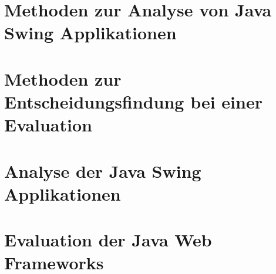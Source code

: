 \documentclass[
11pt, %
a4paper, %
BCOR25mm, %
DIV14, %
footsepline = false, %
headsepline, %
twoside, %
openright,
abstracton, %
listof=totocnumbered, %
bibliography=totocnumbered %
]{scrreprt}
\begin{document}
  

  \cleardoublepage
   
   
  \chapter{Methoden zur Analyse von Java Swing
  Applikationen}\label{chapter:MethodenZurAnalyseVonJavaSwingApplikationen}
  
  

  \cleardoublepage
  
   
  \chapter{Methoden zur Entscheidungsfindung bei einer
  Evaluation}\label{chapter:MethodenZurEntscheidungsfindungBeiEinerEvaluation}
  
  

  \cleardoublepage
   
   
  \chapter{Analyse der Java Swing
  Applikationen}\label{chapter:AnalyseDerJavaSwingApplikationen}
  
  

  \cleardoublepage
  
  
  \chapter{Evaluation der Java Web
  Frameworks}\label{chapter:EvaluationDerJavaWebFrameworks}
  
\end{document}

